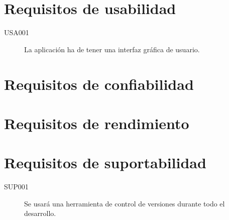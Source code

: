   \section{Requisitos de usabilidad}
    \begin{description}
      \item[USA001] La aplicación ha de tener una interfaz gráfica de usuario.
    \end{description}


  \section{Requisitos de confiabilidad}


  \section{Requisitos de rendimiento}

  \section{Requisitos de suportabilidad}
    \begin{description}
      \item[SUP001] Se usará una herramienta de control de versiones durante todo el desarrollo.
    \end{description}
